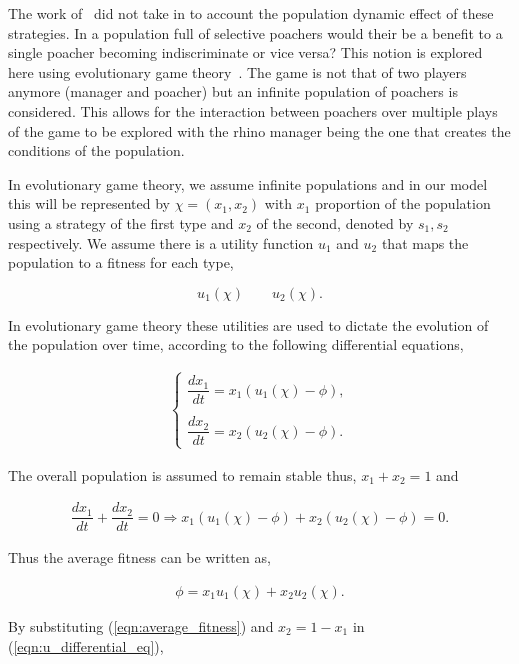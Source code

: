 \documentclass[10pt]{article}
\begin{document}
The work of~\cite{Lee} did not take in to account the population dynamic effect
of  these strategies. In a population full of selective poachers would their be 
a benefit to a single poacher becoming indiscriminate or vice versa? This notion 
is explored here using evolutionary game theory~\cite{Smith}. The 
game is not that of two players anymore (manager and poacher) but an infinite
population of poachers is considered. This allows for the interaction between poachers
over multiple plays of the game to be explored with the rhino manager being the
one that creates the conditions of the population. 

In evolutionary game theory, we assume infinite populations and in our
model this will be represented by \(\chi=(x_1, x_2)\) with \(x_1\) proportion of the
population using a strategy of the first type and \(x_2\) of the second, denoted
by \(s_1, s_2\) respectively. We assume there is a utility function \(u_1\) and 
\(u_2\) that maps the population to a fitness for each type,

\[ u_1(\chi)  \qquad u_2(\chi).\] 

In evolutionary game theory these utilities are used to dictate the evolution of
the population over time, according to the following differential equations,

\begin{eqnarray}
    \label{eqn:u_differential_eq}
    \left\{
    \begin{array}{cl}
    \dfrac{dx_1}{dt}=x_1(u_1(\chi)-\phi),
    \\
    \\
    \dfrac{dx_2}{dt}= x_2(u_2(\chi)-\phi).
    \end{array} \right.
\end{eqnarray}

The overall population is assumed to remain stable thus, \(x_1 + x_2 = 1 \)
and

\begin{eqnarray}
    \dfrac{dx_1}{dt}  + \dfrac{dx_2}{dt} = 0 \Rightarrow x_1(u_1(\chi) - \phi)
     + x_2(u_2(\chi) - \phi)=0.
\end{eqnarray} 

Thus the average fitness can be written as,

\begin{eqnarray}
\label{eqn:average_fitness}
    \phi=x_1u_1(\chi) + x_2u_2(\chi).
\end{eqnarray}

By substituting (\ref{eqn:average_fitness}) and \(x_2= 1 - x_1\) 
in (\ref{eqn:u_differential_eq}),
\end{document}
